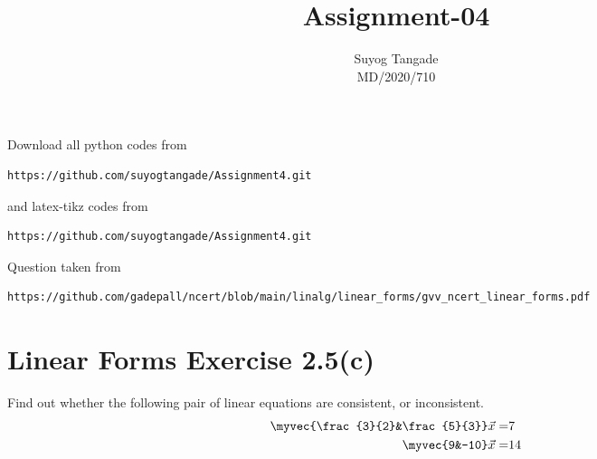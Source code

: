 \documentclass[journal,12pt,twocolumn]{IEEEtran}
\begin{document}
\def\rightbox#1{\makebox[0in][r]{#1}}
\def\centbox#1{\makebox[0in]{#1}}
\def\topbox#1{\raisebox{-\baselineskip}[0in][0in]{#1}}
\def\midbox#1{\raisebox{-0.5\baselineskip}[0in][0in]{#1}}
\vspace{3cm}
\title{Assignment-04}
\author{Suyog Tangade\\MD/2020/710}
\maketitle
\newpage
\bigskip
\renewcommand{\thefigure}{\theenumi}
\renewcommand{\thetable}{\theenumi}
Download all python codes from
\begin{lstlisting}
https://github.com/suyogtangade/Assignment4.git
\end{lstlisting}
%
and latex-tikz codes from
%
\begin{lstlisting}
https://github.com/suyogtangade/Assignment4.git
\end{lstlisting}
%
Question taken from
\begin{lstlisting}
https://github.com/gadepall/ncert/blob/main/linalg/linear_forms/gvv_ncert_linear_forms.pdf
\end{lstlisting}
\section{Linear Forms Exercise 2.5(c)}
Find out whether the following pair of linear
equations are consistent, or inconsistent.
\begin{align}
    \myvec{\frac{3}{2}&\frac{5}{3}}\vec{x}=&7\\
    \myvec{9&-10}\vec{x}=&14
\end{align}
\end{document}
